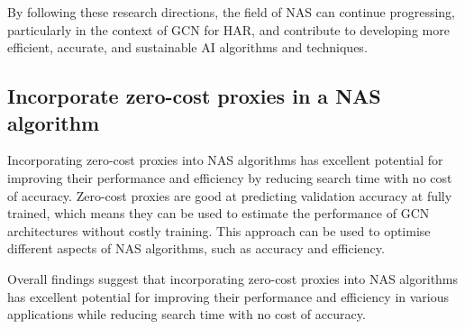 By following these research directions, the field of NAS can continue progressing, particularly in the context of GCN for HAR, and contribute to developing more efficient, accurate, and sustainable AI algorithms and techniques.

\subsection{Incorporate zero-cost proxies in a NAS algorithm}
Incorporating zero-cost proxies into NAS algorithms has excellent potential for improving their performance and efficiency by reducing search time with no cost of accuracy. Zero-cost proxies are good at predicting validation accuracy at fully trained, which means they can be used to estimate the performance of GCN architectures without costly training. This approach can be used to optimise different aspects of NAS algorithms, such as accuracy and efficiency.
\begin{comment}
This research has practical implications for healthcare and sports science, where accurate and efficient HAR is essential for monitoring patient health or athlete performance.     
\end{comment}
Overall findings suggest that incorporating zero-cost proxies into NAS algorithms has excellent potential for improving their performance and efficiency in various applications while reducing search time with no cost of accuracy.